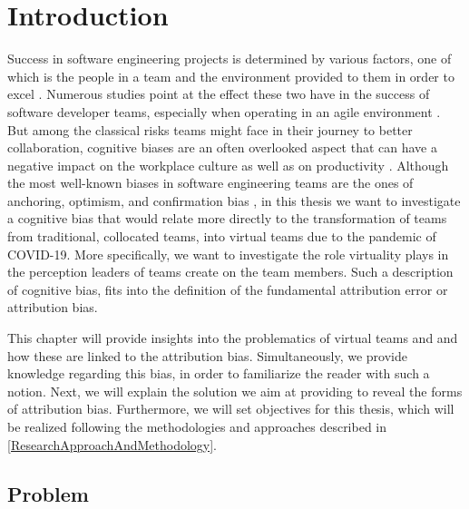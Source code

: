 \chapter{Introduction} \label{Introduction}

Success in software engineering projects is determined by various factors, one of which is the people in a team and the environment provided to them in order to excel \cite{Reel1999}. Numerous studies point at the effect these two have in the success of software developer teams, especially when operating in an agile environment \cite{Lindsjorn2016} \cite{Chow2008}. But among the classical risks teams might face in their journey to better collaboration, cognitive biases are an often overlooked aspect that can have a negative impact on the workplace culture as well as on productivity \cite{Chattopadhyay2020}. Although the most well-known biases in software engineering teams are the ones of anchoring, optimism, and confirmation bias \cite{Mohanai2018}, in this thesis we want to investigate a cognitive bias that would relate more directly to the transformation of teams from traditional, collocated teams, into virtual teams due to the pandemic of COVID-19. More specifically, we want to investigate the role virtuality plays in the perception leaders of teams create on the team members. Such a description of cognitive bias, fits into the definition of the fundamental attribution error or attribution bias. 

This chapter will provide insights into the problematics of virtual teams and and how these are linked to the attribution bias. Simultaneously, we provide knowledge regarding this bias, in order to familiarize the reader with such a notion. Next, we will explain the solution we aim at providing to reveal the forms of attribution bias. Furthermore, we will set objectives for this thesis, which will be realized following the methodologies and approaches described in \ref{ResearchApproachAndMethodology}.

\section{Problem}

